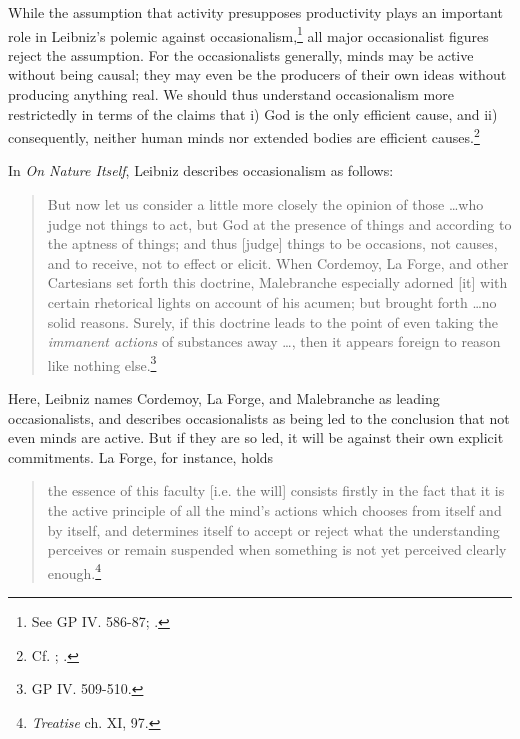 While the assumption that activity presupposes productivity plays an important role in Leibniz's polemic against occasionalism,\footnote{See GP IV. 586-87; \autocite{Rutherford1993}.} all major occasionalist figures reject the assumption. For the occasionalists generally, minds may be active without being causal; they may even be the producers of their own ideas without producing anything real. We should thus understand occasionalism more restrictedly in terms of the claims that i) God is the only efficient cause, and ii) consequently, neither human minds nor extended bodies are efficient causes.\footnote{Cf. \autocite[625-626]{Platt2011}; \autocite[101]{Gouhier1926}.}

In \emph{On Nature Itself}, Leibniz describes occasionalism as follows:

\begin{quote}
	But now let us consider a little more closely the opinion of those \ldots who judge not things to act, but God at the presence of things and according to the aptness of things; and thus [judge] things to be occasions, not causes, and to receive, not to effect or elicit. When Cordemoy, La Forge, and other Cartesians set forth this doctrine, Malebranche especially adorned {[}it{]} with certain rhetorical lights on account of his acumen; but brought forth \ldots no solid reasons. Surely, if this doctrine leads to the point of even taking the \emph{immanent actions} of substances away \ldots, then it appears foreign to reason like nothing else.\footnote{GP IV. 509-510.}
\end{quote}

Here, Leibniz names Cordemoy, La Forge, and Malebranche as leading occasionalists, and describes occasionalists as being led to the conclusion that not even minds are active. But if they are so led, it will be against their own explicit commitments. La Forge, for instance, holds

\begin{quote}
	the essence of this faculty {[}i.e. the will{]} consists firstly in the fact that it is the active principle of all the mind's actions which chooses from itself and by itself, and determines itself to accept or reject what the understanding perceives or remain suspended when something is not yet perceived clearly enough.\footnote{\emph{Treatise} ch. XI, 97.}
\end{quote}

